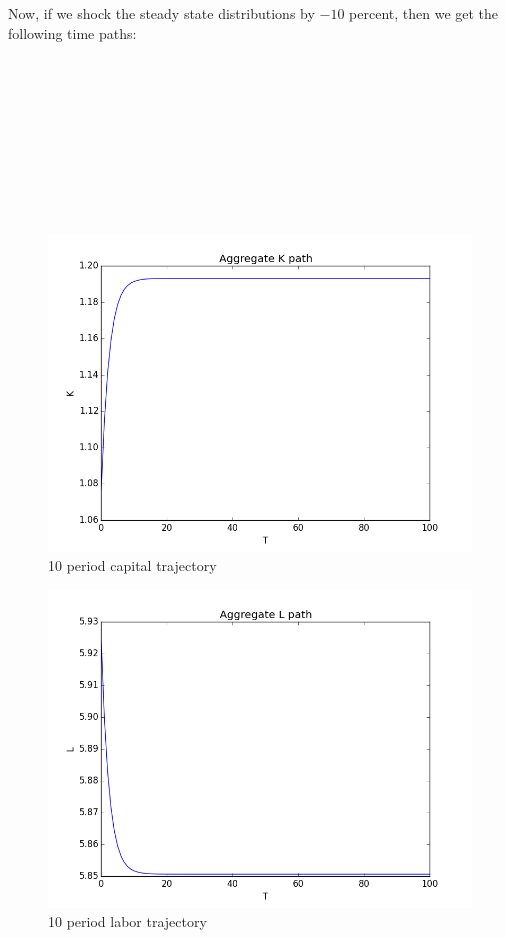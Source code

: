\documentclass[letterpaper,12pt]{article}
\theoremstyle{definition}
\begin{document}
\indent Now, if we shock the steady state distributions by $-10$ percent, then we get the following time paths:\\\\\\
\\\\
\\\\\\\\\\




\begin{figure}[h] 
\includegraphics[scale = .5]{10periodK.png}
\centering 
\caption{10 period capital trajectory}
\end{figure}
\begin{figure}[h] 
\includegraphics[scale = .5]{10periodL.png}
\centering 
\caption{10 period labor trajectory}
\end{figure}
\end{document}
